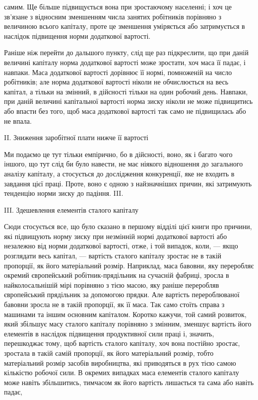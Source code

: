 \parcont{}  %
самим. Ще більше підвищується вона при зростаючому населенні; і хоч це зв’язане з відносним
зменшенням числа занятих робітників порівняно з величиною всього капіталу, проте це зменшення
уміряється або затримується в наслідок підвищення норми додаткової вартості.

Раніше ніж перейти до дальшого пункту, слід ще раз підкреслити, що при даній величині капіталу норма
додаткової вартості може зростати, хоч маса її падає, і навпаки. Маса додаткової вартості дорівнює
її нормі, помноженій на число робітників; але норма додаткової вартості ніколи не обчислюється на
весь капітал, а тільки на змінний, в дійсності тільки на один робочий день. Навпаки, при даній
величині капітальної вартості норма зиску ніколи не може підвищитись або впасти без того, щоб маса
додаткової вартості так само не підвищилась або не впала.

II. Зниження заробітної плати нижче її вартості

Ми подаємо це тут тільки емпірично, бо в дійсності, воно, як і багато чого іншого, що тут слід би
було навести, не має ніякого відношення до загального аналізу капіталу, а стосується до дослідження
конкуренції, яке не входить в завдання цієї праці. Проте, воно є одною з найзначніших причин, які
затримують тенденцію норми зиску до падіння. III.

III. Здешевлення елементів сталого капіталу

Сюди стосується все, що було сказано в першому відділі цієї книги про причини, які підвищують норму
зиску при незмінній нормі додаткової вартості або незалежно від норми додаткової вартості, отже, і
той випадок, коли, — якщо розглядати весь капітал, — вартість сталого капіталу зростає не в такій
пропорції, як його матеріальний розмір. Наприклад, маса бавовни, яку переробляє окремий європейський
робітник-прядільник на сучасній фабриці, зросла в найколосальнішій мірі порівняно з тією масою, яку
раніше переробляв європейський прядільник за допомогою прядки. Але вартість перероблюваної бавовни
зросла не в такій пропорції, як її маса. Так само стоїть справа
з машинами та іншим основним капіталом. Коротко кажучи, той самий розвиток, який збільшує масу
сталого капіталу порівняно з змінним, зменшує вартість його елементів в наслідок підвищення
продуктивної сили праці і, значить, перешкоджає тому, щоб вартість сталого капіталу, хоч вона
постійно зростає, зростала в такій самій пропорції, як його матеріальний розмір, тобто матеріальний
розмір засобів виробництва, які приводяться в рух тією самою кількістю робочої сили. В окремих
випадках маса елементів сталого капіталу може навіть збільшитись, тимчасом як його вартість
лишається та сама або навіть падає,
